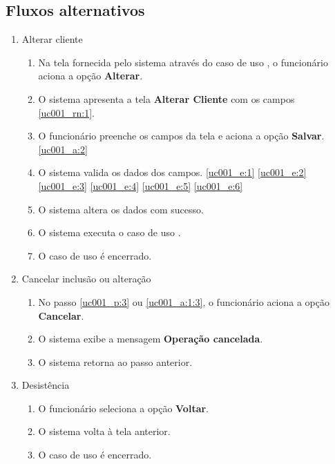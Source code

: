 \subsection{Fluxos alternativos}

\begin{enumerate}[label=A\arabic*]
	\item Alterar cliente \label{uc001_a:1}
	\begin{enumerate}[label*=.\arabic*]
		\item Na tela fornecida pelo sistema através do caso de uso , o funcionário aciona a opção \textbf{Alterar}. 
		\item O sistema apresenta a tela \textbf{Alterar Cliente} com os campos \ref{uc001_rn:1}. \label{uc001_a:1:2}
		\item O funcionário preenche os campos da tela e aciona a opção \textbf{Salvar}. \label{uc001_a:1:3} \ref{uc001_a:2}
		\item O sistema valida os dados dos campos. \ref{uc001_e:1} \ref{uc001_e:2} \ref{uc001_e:3} \ref{uc001_e:4} \ref{uc001_e:5} \ref{uc001_e:6}
		\item O sistema altera os dados com sucesso.
		\item O sistema executa o caso de uso .
		\item O caso de uso é encerrado.
	\end{enumerate}

	\item Cancelar inclusão ou alteração \label{uc001_a:2}
	\begin{enumerate}[label*=.\arabic*]
		\item No passo \ref{uc001_p:3} ou \ref{uc001_a:1:3}, o funcionário aciona a opção \textbf{Cancelar}.
		\item O sistema exibe a mensagem \textbf{Operação cancelada}.
		\item O sistema retorna ao passo anterior.
	\end{enumerate}

	\item Desistência
	\begin{enumerate}[label*=.\arabic*]
		\item O funcionário seleciona a opção \textbf{Voltar}.
		\item O sistema volta à tela anterior.
		\item O caso de uso é encerrado.		
	\end{enumerate}		 	
\end{enumerate}

